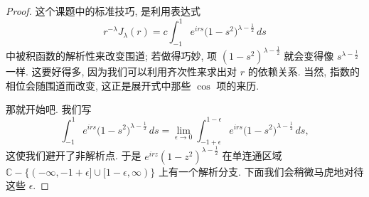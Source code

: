 \begin{proof}
这个课题中的标准技巧, 是利用表达式
\[
r^{-\lambda}J_{\lambda}(r)=c\int_{-1}^{1}e^{irs}\bigl(1-s^{2}\bigr)^{\lambda-\frac{1}{2}}\,ds
\]
中被积函数的解析性来改变围道; 若做得巧妙, 项 $(1-s^2)^{\lambda-\frac{1}{2}}$ 就会变得像 $s^{\lambda-\frac{1}{2}}$ 一样. 这要好得多, 因为我们可以利用齐次性来求出对 $r$ 的依赖关系. 当然, 指数的相位会随围道而改变, 这正是展开式中那些 $\cos$ 项的来历.

那就开始吧. 我们写
\[
\int_{-1}^{1}e^{irs}\bigl(1-s^{2}\bigr)^{\lambda-\frac{1}{2}}\,ds
=\lim_{\epsilon\to0}\int_{-1+\epsilon}^{1-\epsilon}e^{irs}\bigl(1-s^{2}\bigr)^{\lambda-\frac{1}{2}}\,ds,
\]
这使我们避开了非解析点. 于是 $e^{irz}(1-z^2)^{\lambda-\frac{1}{2}}$ 在单连通区域 $\mathbb{C}-\{(-\infty,-1+\epsilon]\cup[1-\epsilon,\infty)\}$ 上有一个解析分支. 下面我们会稍微马虎地对待这些 $\epsilon$.


\end{proof}
